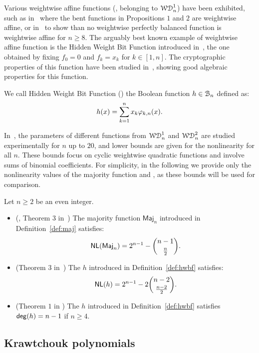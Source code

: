 \documentclass{llncs}
\begin{document}
Various weightwise affine functions (\ie, belonging to $\mathcal{WD}^{1}_{n}$) have been exhibited, such as in~\cite{TOSC:CarMeaRot17} where the bent functions in Propositions $1$ and $2$ are weightwise affine, or in~\cite{DAM:GinMea22} to show than no weightwise perfectly balanced function is weightwise affine for $n\geq 8$. 
The arguably best known example of weightwise affine function is the Hidden Weight Bit Function introduced in~\cite{IEEE:Bryant91}, the one obtained by fixing $f_0=0$ and $f_k=x_k$ for $k \in [1,n]$. The cryptographic properties of this function have been studied in~\cite{DAM:WCST14}, showing good algebraic properties for this function.

\begin{definition}\label{def:hwbf}
    We call Hidden Weight Bit Function (\hwbf{}) the Boolean function $h\in\mathcal{B}_n$ defined as:
	\[
		h(x)=\sum_{k=1}^{n}x_k\varphi_{k,n}(x).
	\]
\end{definition}

In~\cite{DAM:MeaOza24}, the parameters of different functions from $\mathcal{WD}^{1}_{n}$ and $\mathcal{WD}^{2}_{n}$ are studied experimentally for $n$ up to $20$, and lower bounds are given for the nonlinearity for all $n$. 
These bounds focus on cyclic weightwise quadratic functions and involve sums of binomial coefficients. For simplicity, in the following we provide only the nonlinearity values of the majority function and \hwbf{}, as these bounds will be used for comparison.

\begin{Prop}\label{prop:wwd1}
	Let $n\geq 2$ be an even integer.
	\begin{itemize}
		\item (\eg, Theorem $3$ in~\cite{DCC:DalMaiSar06}) The majority function $\mathsf{Maj}_n$ introduced in Definition~\ref{def:maj} satisfies:
		\[
			\mathsf{NL}(\mathsf{Maj}_n)=2^{n-1}-\binom{n-1}{\frac n2}.
		\]
		\item (Theorem $3$ in~\cite{DAM:WCST14}) The \hwbf{} $h$ introduced in Definition~\ref{def:hwbf} satisfies:
		\[
			\mathsf{NL}(h)=2^{n-1}-2\binom{n-2}{\frac{n-2}{2}}.
		\]	
		\item (Theorem $1$ in \cite{DAM:WCST14}) The \hwbf{} $h$ introduced in Definition~\ref{def:hwbf} satisfies $\mathsf{deg}(h)=n-1$ if $n\geq 4$.
	\end{itemize}
\end{Prop}

\subsection{Krawtchouk polynomials}
\end{document}
